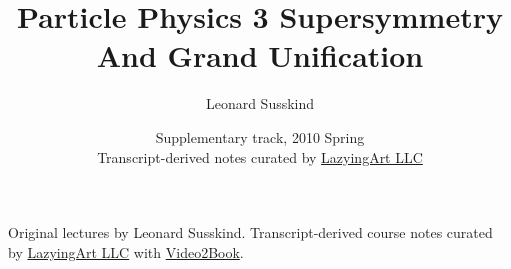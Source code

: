 \documentclass[11pt,oneside]{book}
\begin{document}
\frontmatter
\title{Particle Physics 3 Supersymmetry And Grand Unification}
\author{Leonard Susskind}
\date{Supplementary track, 2010 Spring \\ Transcript-derived notes curated by \href{https://lazying.art}{LazyingArt LLC}}
\maketitle
\begin{center}
\small Original lectures by Leonard Susskind. Transcript-derived course notes curated by \href{https://lazying.art}{LazyingArt LLC} with \href{https://github.com/lachlanchen/Video2Book}{Video2Book}.
\end{center}
\clearpage
\tableofcontents
\mainmatter










\end{document}
